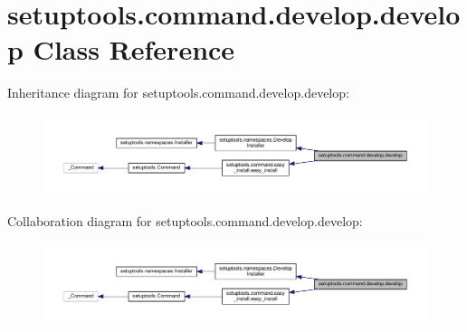 \hypertarget{classsetuptools_1_1command_1_1develop_1_1develop}{}\section{setuptools.\+command.\+develop.\+develop Class Reference}
\label{classsetuptools_1_1command_1_1develop_1_1develop}


Inheritance diagram for setuptools.\+command.\+develop.\+develop\+:
\nopagebreak
\begin{figure}[H]
\begin{center}
\leavevmode
\includegraphics[width=350pt]{classsetuptools_1_1command_1_1develop_1_1develop__inherit__graph}
\end{center}
\end{figure}


Collaboration diagram for setuptools.\+command.\+develop.\+develop\+:
\nopagebreak
\begin{figure}[H]
\begin{center}
\leavevmode
\includegraphics[width=350pt]{classsetuptools_1_1command_1_1develop_1_1develop__coll__graph}
\end{center}
\end{figure}
